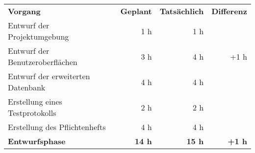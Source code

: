 \begin{tabular}{lrrr}
\rowcolor{heading}\textbf{Vorgang} & \textbf{Geplant} & \textbf{Tatsächlich} & \textbf{Differenz} \\
Entwurf der Projektumgebung & 1 h & 1 h &  \\
\rowcolor{odd}Entwurf der Benutzeroberflächen & 3 h & 4 h & +1 h \\
Entwurf der erweiterten Datenbank & 4 h & 4 h &  \\
\rowcolor{odd}Erstellung eines Testprotokolls & 2 h & 2 h &  \\
Erstellung des Pflichtenhefts & 4 h & 4 h &  \\
\hline
\hline
\rowcolor{heading}\textbf{Entwurfsphase} & \textbf{14 h} & \textbf{15 h} & \textbf{+1 h} \\
\end{tabular}
